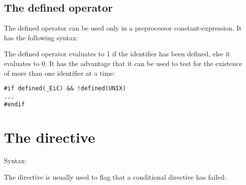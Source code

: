 \subsection{The defined operator} 

The defined operator can be used only in a preprocessor
constant-expression. It has the following syntax:
\begin{production}
\end{production}

The defined operator evaluates to 1 if the identifier has been
defined, else it evaluates to 0. It has the advantage that it
can be used to test for the existence of more than one identifier at a
time:

\begin{production}
\begin{verbatim}
#if defined(_EiC) && !defined(UNIX)
...
#endif
\end{verbatim}
\end{production}


\section{The  directive} 
Syntax:
\begin{production}
\end{production}


The  directive is usually used to flag that a
conditional directive has failed:

\begin{production}
\end{production}

